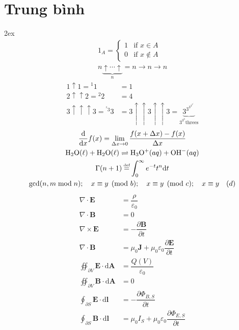 \documentclass[a4paper,12pt,notitlepage]{article}
\newcommand{\f}[2]{\dfrac{#1}{#2}}
\begin{document}
	\section{Trung bình}
	\openup 2ex
	\begin{gather}
		1_A = 
		\begin{cases}
			1 & \text{if } x \in A \\
			0 & \text{if } x \notin A
		\end{cases} \\	
		n \underbrace{\uparrow \cdots \uparrow}_n = n \rightarrow n \rightarrow n
	\end{gather}
	\begin{align}
		1 \uparrow 1 = {^1}1 &= 1 \nonumber \\
		2 \uparrow \uparrow 2 = {^2}2 &= 4 \nonumber \\
		3 \uparrow \uparrow \uparrow 3 = {^{^{^3}3}}3 %
		&= 3 \uparrow \uparrow 3 \uparrow \uparrow 3 = \underbrace{3^{3^{3^{3^{3^{3^{.^{.^{.^{3}}}}}}}}}}_{3^{3^3} \text{threes}}
	\end{align}
	\begin{gather}
		\f{\mathrm{d}}{\mathrm{d} x} f(x) = \lim_{\Delta x \to 0} \f{f(x+\Delta x) - f(x)}{\Delta x} \\
		\mathrm{H_2O}(\ell) + \mathrm{H_2O}(\ell) \rightleftharpoons \mathrm{H_3O^+} (aq) + \mathrm{OH^-} (aq) \\
		\Gamma (n+1) \stackrel{\mathclap{\tiny\mbox{def}}}{=} \int_0^{\infty} e^{-t}t^n \mathrm{d} t \\
		\gcd(n,m \bmod n); \quad x \equiv y \pmod{b}; \quad x \equiv y \pmod{c}; \quad x \equiv y \quad (d)
	\end{gather}
	\begin{align}
		\nabla \cdot \mathbf{E} &= \f{\rho}{\varepsilon_0} \nonumber \\
		\nabla \cdot \mathbf{B} &= 0 \nonumber \\
		\nabla \times \mathbf{E} &= -\f{\partial \mathbf{B}}{\partial t} \nonumber \\
		\nabla \cdot \mathbf{B} &= \mu_0 \mathbf{J} + \mu_0 \varepsilon_0 \f{\partial \mathbf{E}}{\partial t} \\
		\oiint_{\partial V} \mathbf{E} \cdot \mathrm{d} \mathbf{A} &= \f{Q(V)}{\varepsilon_0} \nonumber \\
		\oiint_{\partial V} \mathbf{B} \cdot \mathrm{d} \mathbf{A}  &= 0 \nonumber \\
		\oint_{\partial S} \mathbf{E} \cdot \mathrm{d} \mathbf{l} &= -\f{\partial \Phi_{B,S}}{\partial t} \nonumber \\
		\oint_{\partial S} \mathbf{B} \cdot \mathrm{d} \mathbf{l} &= \mu_0 I_S + \mu_0 \varepsilon_0 \f{\partial \Phi_{E,S}}{\partial t}
	\end{align}
\end{document}
